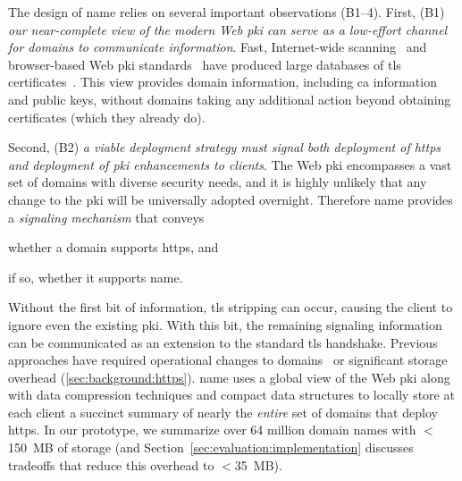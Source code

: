 The design of \ac{name} relies on several important observations (B1--4). First,
(B1) \emph{our near-complete view of the modern Web \ac{pki} can serve as a
low-effort channel for domains to communicate information}. Fast, Internet-wide
scanning~\cite{durumeric2013zmap} and browser-based Web \ac{pki}
standards~\cite{sleevi2016requiring} have produced large databases of \ac{tls}
certificates~\cite{durumeric2015search}. 
This view provides domain information, including \ac{ca} information and public
keys, without domains taking any additional action beyond obtaining certificates
(which they already do).

Second, (B2) \emph{a viable deployment strategy must signal both deployment of
\ac{https} and deployment of \ac{pki} enhancements to clients}. The Web \ac{pki}
encompasses a vast set of domains with diverse security needs, and it is highly
unlikely that any change to the \ac{pki} will be universally adopted overnight.
Therefore \ac{name} provides a \emph{signaling mechanism} that conveys
\begin{inparaenum}
\item whether a domain supports \ac{https}, and
\item if so, whether it supports \ac{name}.
\end{inparaenum}
Without the first bit of information, \ac{tls} stripping can occur, causing the
client to ignore even the existing \ac{pki}. With this bit, the remaining
signaling information can be communicated as an extension to the standard
\ac{tls} handshake. Previous approaches have required operational changes to
domains~\cite{rfc4033, rfc6698} or significant storage overhead
(\autoref{sec:background:https}). \ac{name} uses a global view of the Web
\ac{pki} along with data compression techniques and compact data
structures to locally store at each client a succinct summary of nearly the
\emph{entire} set of domains that deploy \ac{https}. In our prototype, we
summarize over 64 million domain names with $<$150~MB of storage (and
Section~\ref{sec:evaluation:implementation} discusses tradeoffs that
reduce this overhead to $<$35~MB).

